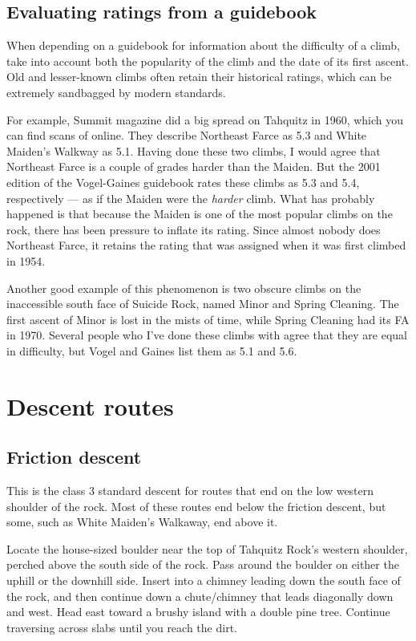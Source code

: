 \documentclass{tahquitz}
\begin{document}
\subsection{Evaluating ratings from a guidebook}

When depending on a guidebook for information about the difficulty of a climb, take
into account both the popularity of the climb and the date of its first ascent.
Old and lesser-known climbs often retain their historical ratings, which can be
extremely sandbagged by modern standards.

For example,
Summit magazine did a big spread on Tahquitz in 1960, which you can find scans of online.
They describe Northeast Farce as 5.3 and White Maiden's Walkway as 5.1. Having done
these two climbs, I would agree that Northeast Farce is a couple of grades harder
than the Maiden. But the 2001 edition
of the Vogel-Gaines guidebook rates these climbs as 5.3 and 5.4, respectively --- as if
the Maiden were the \emph{harder} climb. What has
probably happened is that because the Maiden is one of the most popular climbs on
the rock, there has been pressure to inflate its rating. Since almost nobody does Northeast
Farce, it retains the rating that was assigned when it was first climbed in 1954.

Another good example of this phenomenon is two obscure climbs on the inaccessible
south face of Suicide Rock, named Minor and Spring Cleaning. The first ascent of Minor is
lost in the mists of time, while Spring Cleaning had its FA in 1970. Several people who
I've done these climbs with agree that they are equal in difficulty, but Vogel and Gaines
list them as 5.1 and 5.6.

\pagebreak

\section{Descent routes}

\subsection{Friction descent}\label{subsec:friction-descent}

This is the class 3 standard descent for routes that end on the low western shoulder of the rock.
Most of these routes end below the friction descent, but some, such as White Maiden's Walkaway,
end above it.

Locate the house-sized boulder near the top of Tahquitz Rock's western shoulder,
perched above the south side of the rock. Pass around the boulder on either the
uphill or the downhill side. Insert into a chimney
leading down the south face of the rock, and then continue down a
chute/chimney that leads diagonally down and west.  Head east toward a
brushy island with a double pine tree. Continue traversing across
slabs until you reach the dirt.
\end{document}

